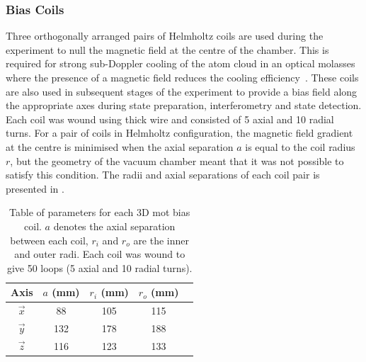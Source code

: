 \subsubsection{Bias Coils}
Three orthogonally arranged pairs of Helmholtz coils are used during the
experiment to null the magnetic field at the centre of the chamber. This is
required for strong sub-Doppler cooling of the atom cloud in an optical molasses
where the presence of a magnetic field reduces the cooling
efficiency~\cite{Walhout1992}. These coils are also used in subsequent stages of
the experiment to provide a bias field along the appropriate axes during state
preparation, interferometry and state detection. Each coil was wound using
 thick wire and consisted of 5 axial and 10 radial
turns. For a pair of coils in Helmholtz configuration, the magnetic field
gradient at the centre is minimised when the axial separation \(a\) is equal to
the coil radius \(r\), but the geometry of the vacuum chamber meant that it was
not possible to satisfy this condition. The radii and axial separations of each
coil pair is presented in .\begin{table}
	\begin{tabular}{|c|c|c|c|c|}
		\hline
		Axis        & \(a\) (mm) & \(r_i\) (mm) & \(r_o\) (mm) \\
		\hline
		\(\vec{x}\) & 88         & 105          & 115          \\
		\(\vec{y}\) & 132        & 178          & 188          \\
		\(\vec{z}\) & 116        & 123          & 133          \\
		\hline
	\end{tabular}
	\caption[Table of parameters for each 3D \ac{mot} bias coil.]{Table of
		parameters for each 3D \ac{mot }bias coil. \(a\) denotes the axial
		separation between each coil, \(r_i\) and \(r_o\) are the inner and
		outer radi. Each coil was wound to give 50 loops (5 axial and 10 radial
		turns).}
	\label{tab:bias_coils}
\end{table}
